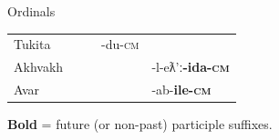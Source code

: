 \begin{frame}{Ordinals}
\begin{table}[h]
\begin{tabular}{l|llll}
Tukita    &                              &                                & -du-\textsc{cm}                       &                           \\
\rowcolor[HTML]{EFEFEF} 
Akhvakh &                              &                                &                              & -l-eƛ'ː\textbf{-ida-\textsc{cm}}   \\
Avar                                                         &                              &                                &                              & -ab-\textbf{ile-\textsc{cm}}       
\end{tabular}
\end{table}

\begin{center}
\tiny \textbf{Bold} = future (or non-past) participle suffixes.
\end{center}
\end{frame}

